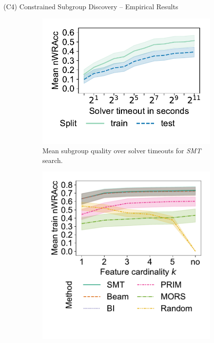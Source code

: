 \documentclass[en, navbarinline, handout]{sdqbeamer}
\begin{document}
\begin{frame}[t]{(C4) Constrained Subgroup Discovery -- Empirical Results}
	\begin{figure}
		\centering
		\begin{subfigure}[t]{0.32\textwidth}
			\centering
			\includegraphics[width=\textwidth, trim={15 -27 15 15}, clip]{plots/csd-timeouts-nwracc.pdf} %
			\caption*{Mean subgroup quality over solver timeouts for \emph{SMT} search.}
		\end{subfigure}
		\hfill
		\pause
		\begin{subfigure}[t]{0.32\textwidth}
			\centering
			\includegraphics[width=\textwidth, trim={15 50 15 18}, clip]{plots/csd-cardinality-train-nwracc-no-timeout-datasets.pdf}

\end{subfigure}
\end{figure}
\end{frame}
\end{document}
